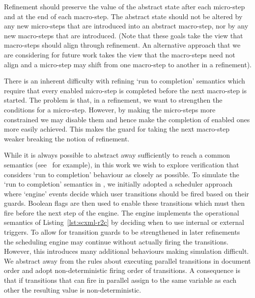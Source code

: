 Refinement should preserve the value of the abstract state after each micro-step and at the end of each macro-step. The abstract state should not be altered by any new micro-steps that are introduced into an abstract macro-step, nor by any new macro-steps that are introduced. (Note that these goals take the view that macro-steps should align through refinement. An alternative approach that we are considering for future work takes the view that the macro-steps need not align and a micro-step may shift from one macro-step to another in a refinement). 

There is an inherent difficulty with refining `run to completion' semantics which require that every enabled micro-step is completed before the next macro-step is started. The problem is that, in a refinement, we want to strengthen the conditions for a micro-step. However, by making the micro-steps more constrained we may disable them and hence make the completion of enabled ones more easily achieved. This makes the guard for taking the next macro-step weaker breaking the notion of refinement.

While it is always possible to abstract away sufficiently to reach a common semantics (see~\cite{Snook12:FMCO} for example), in this work we wish to explore verification that considers `run to completion' behaviour as closely as possible.    
To simulate the `run to completion' semantics in \EventB, we initially adopted a scheduler approach where `engine' events decide which user transitions should be fired based on their guards. 
Boolean flags are then used to enable these transitions which must then fire before the next step of the engine.
The engine implements the operational semantics of Listing~\ref{lst:scxml-r2c} by deciding when to use internal or external triggers.
To allow for transition guards to be strengthened in later refinements the scheduling engine may continue without actually firing the transitions.
However, this introduces many additional behaviours making simulation difficult.
We abstract away from the \SCXML rules about executing parallel transitions in document order and adopt non-deterministic firing order of transitions. 
A consequence is that if transitions that can fire in parallel assign to the same variable as each other the resulting value is non-deterministic.

